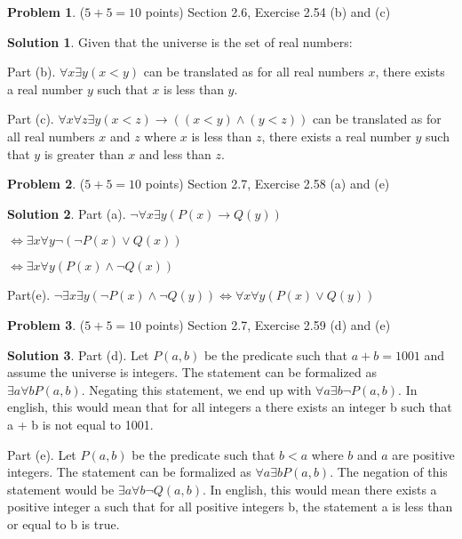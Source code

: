 \documentclass{article}
\theoremstyle{definition}
\newtheorem{problem}{Problem}
\newtheorem*{solution}{Solution}
\begin{document}
\newpage
\begin{problem} ($5+5=10$ points) Section 2.6, Exercise 2.54 (b) and (c)
\end{problem}
\begin{solution}
Given that the universe is the set of real numbers:

Part (b). $\forall x \exists y (x < y)$ can be translated as for all real numbers $x$, there exists a real number $y$ such that $x$ is less than $y$.

Part (c). $\forall x \forall z \exists y (x < z) \rightarrow ((x < y) \land (y < z))$ can be translated as for all real numbers $x$ and $z$ where $x$ is less than $z$, there exists a real number $y$ such that $y$ is greater than $x$ and less than $z$.

\end{solution}

\newpage
\begin{problem} ($5+5=10$ points) Section 2.7, Exercise 2.58 (a) and (e)
\end{problem}
\begin{solution} 
Part (a). $\neg \forall x \exists y (P(x) \rightarrow Q(y))$ 

$\Leftrightarrow \exists x \forall y \neg (\neg P(x) \lor Q(x))$ 

$\Leftrightarrow \exists x \forall y (P(x) \land \neg Q(x))$

Part(e). $\neg \exists x \exists y (\neg P(x) \land \neg Q(y)) \Leftrightarrow \forall x \forall y (P(x) \lor Q(y))$
\end{solution}

\newpage
\begin{problem} ($5+5=10$ points) Section 2.7, Exercise 2.59 (d) and (e)
\end{problem}
\begin{solution} 
Part (d). Let $P(a, b)$ be the predicate such that $a + b = 1001$ and assume the universe is integers.
The statement can be formalized as $\exists a \forall b P(a, b)$.
Negating this statement, we end up with $\forall a \exists b \neg P(a, b)$.
In english, this would mean that for all integers a there exists an integer b such that a + b is not equal to 1001.

Part (e). Let $P(a, b)$ be the predicate such that $b < a$ where $b$ and $a$ are positive integers. 
The statement can be formalized as $\forall a \exists b P(a, b)$.
The negation of this statement would be $\exists a \forall b \neg Q(a, b)$.
In english, this would mean there exists a positive integer a such that for all positive integers b, the statement a is less than or equal to b is true.
\end{solution}
\end{document}
